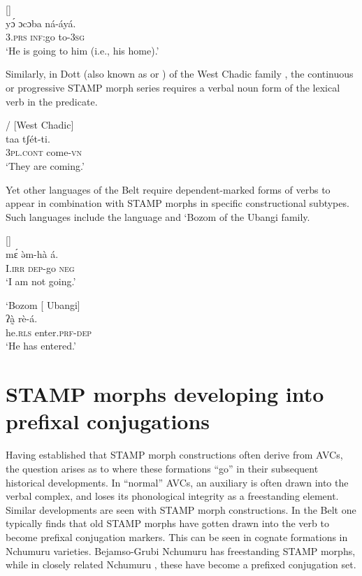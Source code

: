\documentclass[output=paper]{langsci/langscibook}
\begin{document}
\ea\label{ex:anderson:35}
 \citep[22]{Wilkendorf2001}          []\\
\gll y\'{ɔ}    ɔcɔba  ná-áyá.\\
3.\textsc{prs}  \textsc{inf}:go  to-\textsc{3sg}\\
\glt `He is going to him (i.e., his home).' 
\z

Similarly, in Dott (also known as  or ) of the West Chadic family , the continuous or progressive STAMP morph series requires a verbal noun form of the lexical verb in the predicate. 

\ea\label{ex:anderson:36}
/ \citep[165]{Caron2002}            [West Chadic]\\
\gll taa    tʃét-ti.\\
\textsc{3pl.cont}  come-\textsc{vn}\\
\glt `They are coming.'
\z

Yet other languages of the  Belt require dependent-marked forms of verbs to appear in combination with STAMP morphs in specific constructional subtypes. Such languages include the  language   and `Bozom  of the  Ubangi family. 

\ea\label{ex:anderson:37}
  \citep[96-98; 105]{BendorSamuelEtAl1973}     []\\
\gll m\'{ɛ}     \`{ə}m-hà     á.\\
I.\textsc{irr}  \textsc{dep}-go   \textsc{neg}  \\
\glt `I am not going.' 
\z

\ea\label{ex:anderson:38}
`Bozom \citep[159]{Monino1995}            [ Ubangi]\\
\gll ʔà̰    rè-á.      \\
he.\textsc{rls}  enter.\textsc{prf}-\textsc{dep} \\
\glt `He has entered.'
\z

\section{STAMP morphs developing into prefixal conjugations}\label{sec:Anderson:6}


Having established that STAMP morph constructions often derive from AVCs, the question arises as to where these formations ``go'' in their subsequent historical developments. In ``normal'' AVCs, an auxiliary is often drawn into the verbal complex, and loses its phonological integrity as a freestanding element. Similar developments are seen with STAMP morph constructions. In the  Belt one typically finds that old STAMP morphs have gotten drawn into the verb to become prefixal conjugation markers. This can be seen in cognate formations in Nchumuru varieties. Bejamso-Grubi Nchumuru  has freestanding STAMP morphs, while in closely related  Nchumuru , these have become a prefixed conjugation set.
\end{document}
